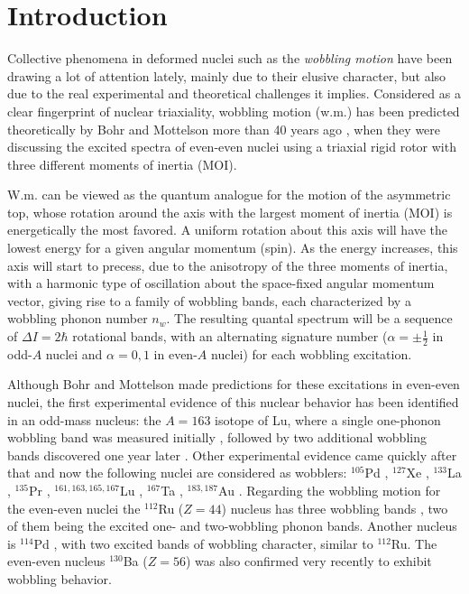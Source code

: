\documentclass[myclassdoc,debug]{rjparticle}
\begin{document}
\section{Introduction}
Collective phenomena in deformed nuclei such as the \emph{wobbling motion} have been drawing a lot of attention lately, mainly due to their elusive character, but also due to the real experimental and theoretical challenges it implies. Considered as a clear fingerprint of nuclear triaxiality, wobbling motion (w.m.) has been predicted theoretically by Bohr and Mottelson more than 40 years ago \cite{bohr1998nuclear}, when they were discussing the excited spectra of even-even nuclei using a triaxial rigid rotor with three different moments of inertia (MOI). 

W.m. can be viewed as the quantum analogue for the motion of the asymmetric top, whose rotation around the axis with the largest moment of inertia (MOI) is energetically the most favored. A uniform rotation about this axis will have the lowest energy for a given angular momentum (spin). As the energy increases, this axis will start to precess, due to the anisotropy of the three moments of inertia, with a harmonic type of oscillation about the space-fixed angular momentum vector, giving rise to a family of wobbling bands, each characterized by a wobbling phonon number $n_w$. The resulting quantal spectrum will be a sequence of $\Delta I=2\hbar$ rotational bands, with an alternating signature number ($\alpha=\pm\frac{1}{2}$ in odd-$A$ nuclei and $\alpha=0,1$ in even-$A$ nuclei) for each wobbling excitation.

Although Bohr and Mottelson made predictions for these excitations in even-even nuclei, the first experimental evidence of this nuclear behavior has been identified in an odd-mass nucleus: the $A=163$ isotope of Lu, where a single one-phonon wobbling band was measured initially \cite{odegaard2001evidence}, followed by two additional wobbling bands discovered one year later \cite{jensen2002evidence,jensen2002wobbling}. Other experimental evidence came quickly after that and now the following nuclei are considered as wobblers: $^{105}$Pd \cite{timar2019experimental}, $^{127}$Xe \cite{chakraborty2020multiphonon}, $^{133}$La \cite{biswas2019longitudinal}, $^{135}$Pr \cite{matta2017transverse,sensharma2019two}, $^{161,163,165,167}$Lu \cite{bringel2005evidence,jensen2002evidence,jensen2002wobbling,schonwasser2003one,amro2003wobbling}, $^{167}$Ta \cite{hartley2009wobbling}, $^{183,187}$Au \cite{nandi2020first,sensharma2020longitudinal}. Regarding the wobbling motion for the even-even nuclei the $^{112}$Ru ($Z=44$) nucleus has three wobbling bands \cite{hamilton2010super}, two of them being the excited one- and two-wobbling phonon bands. Another nucleus is $^{114}$Pd \cite{luo2013triaxial}, with two excited bands of wobbling character, similar to $^{112}$Ru. The even-even nucleus $^{130}$Ba ($Z=56$) \cite{petrache2019diversity,wang2020two,chen2019transverse} was also confirmed very recently to exhibit wobbling behavior.
\end{document}
